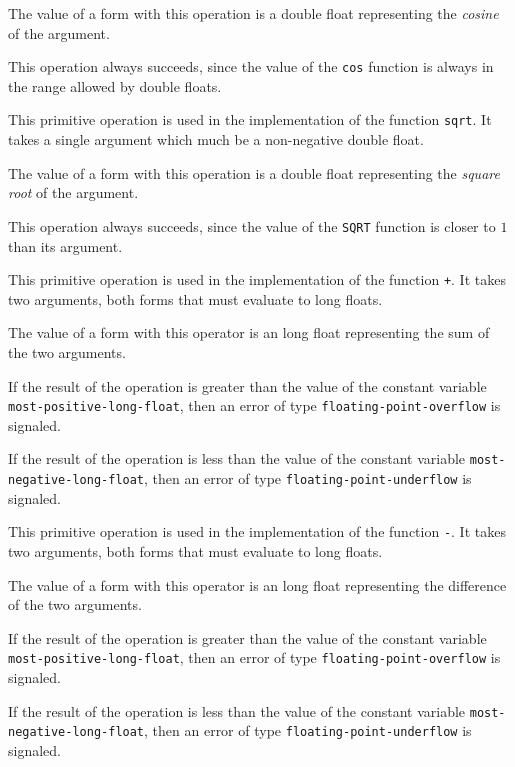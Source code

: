 The value of a form with this operation is a double float representing
the \emph{cosine} of the argument.

This operation always succeeds, since the value of the \texttt{cos}
function is always in the range allowed by double floats.

 {}

This primitive operation is used in the implementation of the
\commonlisp{} function \texttt{sqrt}.  It takes a single argument which
much be a non-negative double float.

The value of a form with this operation is a double float representing
the \emph{square root} of the argument.

This operation always succeeds, since the value of the \texttt{SQRT}
function is closer to $1$ than its argument.

 {}

This primitive operation is used in the implementation of the
\commonlisp{} function \texttt{+}.  It takes two arguments, both forms
that must evaluate to long floats.

The value of a form with this operator is an long float
representing the sum of the two arguments.

If the result of the operation is greater than the value of the
constant variable \texttt{most-positive-long-float}, then an error of
type \texttt{floating-point-overflow} is signaled.

If the result of the operation is less than the value of the
constant variable \texttt{most-negative-long-float}, then an error of
type \texttt{floating-point-underflow} is signaled.

 {}

This primitive operation is used in the implementation of the
\commonlisp{} function \texttt{-}.  It takes two arguments, both forms
that must evaluate to long floats.

The value of a form with this operator is an long float
representing the difference of the two arguments.

If the result of the operation is greater than the value of the
constant variable \texttt{most-positive-long-float}, then an error of
type \texttt{floating-point-overflow} is signaled.

If the result of the operation is less than the value of the
constant variable \texttt{most-negative-long-float}, then an error of
type \texttt{floating-point-underflow} is signaled.

